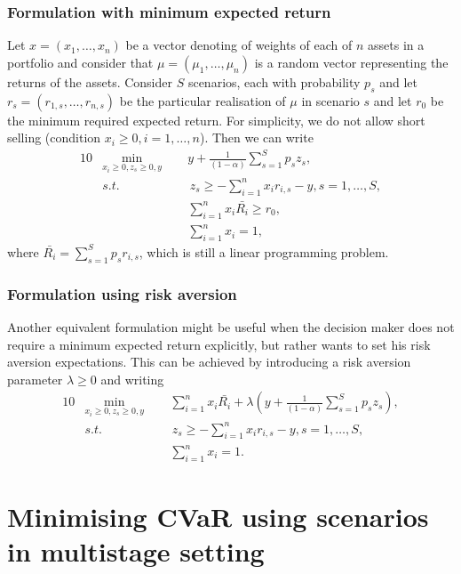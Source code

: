 \subsubsection*{Formulation with minimum expected return}
Let $x=(x_1,\dots,x_n)$ be a vector denoting of weights of each of $n$ assets in a portfolio and consider that $\mu=(\mu_1,\dots,\mu_n)$ is a random vector representing the returns of the assets. Consider $S$ scenarios, each with probability $p_s$ and let $r_s = (r_{1,s},\dots,r_{n,s})$ be the particular realisation of $\mu$ in scenario $s$ and let $r_0$ be the minimum required expected return. For simplicity, we do not allow short selling (condition $x_i \geq 0, i=1,\dots,n$). Then we can write
\begin{alignat}{10}
& \underset{x_i \geq 0 , z_s \geq 0, y}{\min}  \, \, \, && y + \frac{1}{(1-\alpha)} \sum_{s=1}^S p_s z_s, \nonumber \\ 
&s.t. && \, z_s \geq  -\sum_{i=1}^{n} x_i r_{i,s} -y, s=1,\dots,S, \nonumber \\
&  && \sum_{i=1}^{n} x_i \bar{R_i} \geq r_0, \nonumber \\
&  && \sum_{i=1}^{n} x_i = 1, \nonumber
\end{alignat}
where $\bar{R_i}=\sum_{s=1}^{S}p_s r_{i,s}$, which is still a linear programming problem.
\subsubsection*{Formulation using risk aversion}
Another equivalent formulation might be useful when the decision maker does not require a minimum expected return explicitly, but rather wants to set his risk aversion expectations. This can be achieved by introducing a risk aversion parameter $\lambda \geq 0$ and writing
\begin{alignat}{10}
\label{eq:cvar_risk_aversion}
& \underset{x_i \geq 0 , z_s \geq 0, y}{\min}  \, \, \, && \sum_{i=1}^{n} x_i \bar{R_i} + \lambda \left( y + \frac{1}{(1-\alpha)} \sum_{s=1}^S p_s z_s \right), \nonumber \\
&s.t. && \, z_s \geq  -\sum_{i=1}^{n} x_i r_{i,s} -y, s=1,\dots,S, \nonumber \\
&  && \sum_{i=1}^{n} x_i = 1. \nonumber
\end{alignat}
\section{Minimising CVaR using scenarios in multistage setting}
